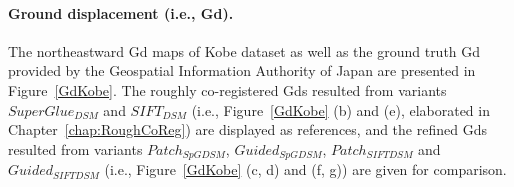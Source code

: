 \paragraph{Ground displacement (i.e., Gd).}
The northeastward Gd %
maps of Kobe dataset as well as the ground truth Gd provided by the Geospatial Information Authority of Japan %
are presented in Figure~\ref{GdKobe}. 
The roughly co-registered Gds resulted from variants $SuperGlue_{DSM}$ and $SIFT_{DSM}$ (i.e., Figure~\ref{GdKobe} (b) and (e), elaborated in Chapter~\ref{chap:RoughCoReg}) are displayed as references, and the refined Gds resulted from variants $Patch_{SpGDSM}$, $Guided_{SpGDSM}$, $Patch_{SIFTDSM}$ and $Guided_{SIFTDSM}$ (i.e., Figure~\ref{GdKobe} (c, d) and (f, g)) are given for comparison. 

